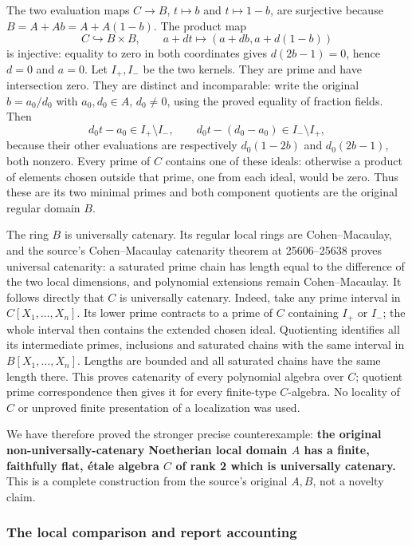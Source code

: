 The two evaluation maps \(C\to B\), \(t\mapsto b\) and \(t\mapsto1-b\), are surjective because \(B=A+Ab=A+A(1-b)\). The product map \[
 C\hookrightarrow B\times B,\qquad
 a+dt\longmapsto(a+db,a+d(1-b))
\] is injective: equality to zero in both coordinates gives \(d(2b-1)=0\), hence \(d=0\) and \(a=0\). Let \(I_+,I_-\) be the two kernels. They are prime and have intersection zero. They are distinct and incomparable: write the original \(b=a_0/d_0\) with \(a_0,d_0\in A\), \(d_0\ne0\), using the proved equality of fraction fields. Then \[
 d_0t-a_0\in I_+\setminus I_-,\qquad
 d_0t-(d_0-a_0)\in I_-\setminus I_+,
\] because their other evaluations are respectively \(d_0(1-2b)\) and \(d_0(2b-1)\), both nonzero. Every prime of \(C\) contains one of these ideals: otherwise a product of elements chosen outside that prime, one from each ideal, would be zero. Thus these are its two minimal primes and both component quotients are the original regular domain \(B\).

The ring \(B\) is universally catenary. Its regular local rings are Cohen--Macaulay, and the source's Cohen--Macaulay catenarity theorem at 25606--25638 proves universal catenarity: a saturated prime chain has length equal to the difference of the two local dimensions, and polynomial extensions remain Cohen--Macaulay. It follows directly that \(C\) is universally catenary. Indeed, take any prime interval in \(C[X_1,\ldots,X_n]\). Its lower prime contracts to a prime of \(C\) containing \(I_+\) or \(I_-\); the whole interval then contains the extended chosen ideal. Quotienting identifies all its intermediate primes, inclusions and saturated chains with the same interval in \(B[X_1,\ldots,X_n]\). Lengths are bounded and all saturated chains have the same length there. This proves catenarity of every polynomial algebra over \(C\); quotient prime correspondence then gives it for every finite-type \(C\)-algebra. No locality of \(C\) or unproved finite presentation of a localization was used.

We have therefore proved the stronger precise counterexample: \textbf{the original non-universally-catenary Noetherian local domain \(A\) has a finite, faithfully flat, étale algebra \(C\) of rank 2 which is universally catenary.} This is a complete construction from the source's original \(A,B\), not a novelty claim.

\subsubsection{The local comparison and report accounting}\label{the-local-comparison-and-report-accounting}

